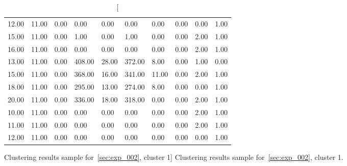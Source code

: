 \begin{table}[h!]
\begin{tabular}{| l l l l l l l l l l |}
        12.00 & 11.00 & 0.00 & 0.00 & 0.00 & 0.00 & 0.00 & 0.00 & 0.00 & 1.00 \\
        15.00 & 11.00 & 0.00 & 1.00 & 0.00 & 1.00 & 0.00 & 0.00 & 2.00 & 1.00 \\
        16.00 & 11.00 & 0.00 & 0.00 & 0.00 & 0.00 & 0.00 & 0.00 & 2.00 & 1.00 \\
        13.00 & 11.00 & 0.00 & 408.00 & 28.00 & 372.00 & 8.00 & 0.00 & 1.00 & 0.00 \\
        15.00 & 11.00 & 0.00 & 368.00 & 16.00 & 341.00 & 11.00 & 0.00 & 2.00 & 1.00 \\
        18.00 & 11.00 & 0.00 & 295.00 & 13.00 & 274.00 & 8.00 & 0.00 & 0.00 & 1.00 \\
        20.00 & 11.00 & 0.00 & 336.00 & 18.00 & 318.00 & 0.00 & 0.00 & 2.00 & 1.00 \\
        10.00 & 11.00 & 0.00 & 0.00 & 0.00 & 0.00 & 0.00 & 0.00 & 2.00 & 1.00 \\
        11.00 & 11.00 & 0.00 & 0.00 & 0.00 & 0.00 & 0.00 & 0.00 & 2.00 & 1.00 \\
        12.00 & 11.00 & 0.00 & 0.00 & 0.00 & 0.00 & 0.00 & 0.00 & 0.00 & 1.00 \\
        \hline
    \end{tabular}

    \caption
        [Clustering results sample for~\ref{sec:exp_002}, cluster 1]
        {Clustering results sample for~\ref{sec:exp_002}, cluster 1.}

    \label{tab:exp_002_cluster_1}
\end{table}
